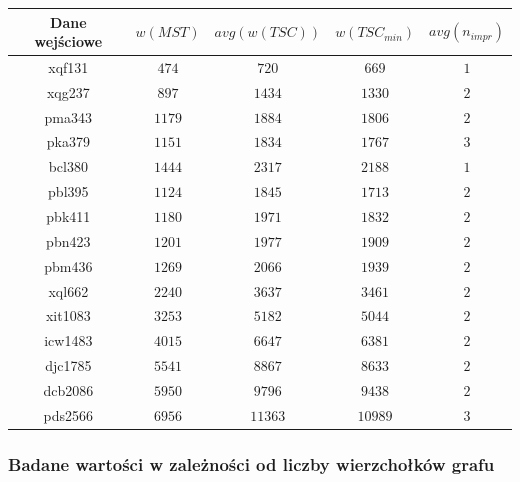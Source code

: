 \documentclass[12pt]{article}
\begin{document}
        \begin{table}[h!]
        \centering
        \begin{tabularx}{0.745\textwidth}{| c | c | c | c | c |}
            \hline
            Dane wejściowe & $w(MST)$ & $avg(w(TSC))$ & $w(TSC_{min})$ & $avg(n_{impr})$ \\
            \hline
            xqf131 & $474$ & $720$ & $669$ & $1$ \\
            xqg237 & $897$ & $1434$ & $1330$ & $2$ \\
            pma343 & $1179$ & $1884$ & $1806$ & $2$ \\
            pka379 & $1151$ & $1834$ & $1767$ & $3$ \\
            bcl380 & $1444$ & $2317$ & $2188$ & $1$ \\
            pbl395 & $1124$ & $1845$ & $1713$ & $2$ \\
            pbk411 & $1180$ & $1971$ & $1832$ & $2$ \\
            pbn423 & $1201$ & $1977$ & $1909$ & $2$ \\
            pbm436 & $1269$ & $2066$ & $1939$ & $2$ \\
            xql662 & $2240$ & $3637$ & $3461$ & $2$ \\
            xit1083 & $3253$ & $5182$ & $5044$ & $2$ \\
            icw1483 & $4015$ & $6647$ & $6381$ & $2$ \\
            djc1785 & $5541$ & $8867$ & $8633$ & $2$ \\
            dcb2086 & $5950$ & $9796$ & $9438$ & $2$ \\
            pds2566 & $6956$ & $11363$ & $10989$ & $3$ \\
            \hline
        \end{tabularx}
        \label{table:ex3}
        \end{table}

    \newpage


    \subsubsection*{Badane wartości w zależności od liczby wierzchołków grafu}
\end{document}
